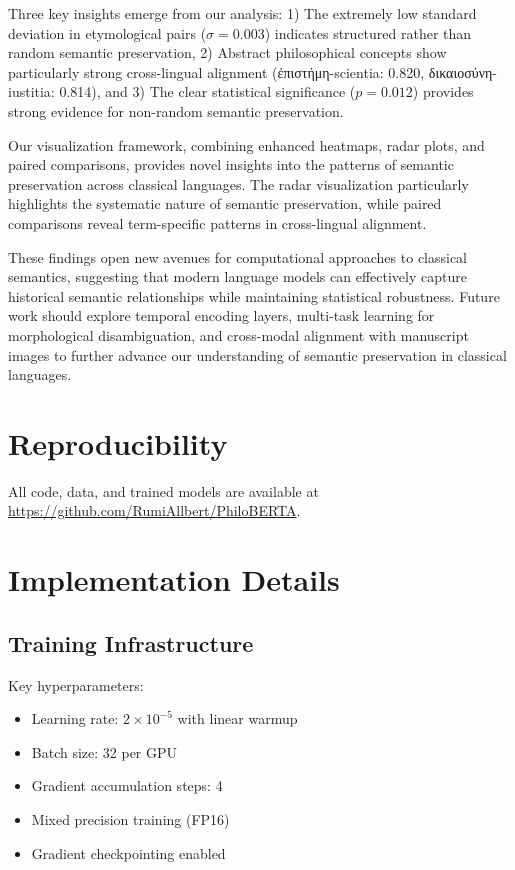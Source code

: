 \documentclass[11pt]{article} %
\begin{document}
Three key insights emerge from our analysis: 1) The extremely low standard deviation in etymological pairs ($\sigma = 0.003$) indicates structured rather than random semantic preservation, 2) Abstract philosophical concepts show particularly strong cross-lingual alignment (ἐπιστήμη-scientia: 0.820, δικαιοσύνη-iustitia: 0.814), and 3) The clear statistical significance ($p = 0.012$) provides strong evidence for non-random semantic preservation.

Our visualization framework, combining enhanced heatmaps, radar plots, and paired comparisons, provides novel insights into the patterns of semantic preservation across classical languages. The radar visualization particularly highlights the systematic nature of semantic preservation, while paired comparisons reveal term-specific patterns in cross-lingual alignment.

These findings open new avenues for computational approaches to classical semantics, suggesting that modern language models can effectively capture historical semantic relationships while maintaining statistical robustness. Future work should explore temporal encoding layers, multi-task learning for morphological disambiguation, and cross-modal alignment with manuscript images to further advance our understanding of semantic preservation in classical languages.

\section{Reproducibility}
All code, data, and trained models are available at \url{https://github.com/RumiAllbert/PhiloBERTA}.

\appendix
\section{Implementation Details}
\subsection{Training Infrastructure}
Key hyperparameters:

\begin{itemize}
\item Learning rate: $2 \times 10^{-5}$ with linear warmup
\item Batch size: 32 per GPU
\item Gradient accumulation steps: 4
\item Mixed precision training (FP16)
\item Gradient checkpointing enabled
\end{itemize}


\end{document}
